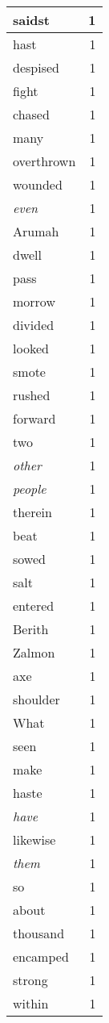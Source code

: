 \begin{center}
\begin{longtable}{l|r}
saidst & 1\\ \hline 
hast & 1\\ \hline 
despised & 1\\ \hline 
fight & 1\\ \hline 
chased & 1\\ \hline 
many & 1\\ \hline 
overthrown & 1\\ \hline 
wounded & 1\\ \hline 
\emph{even} & 1\\ \hline 
Arumah & 1\\ \hline 
dwell & 1\\ \hline 
pass & 1\\ \hline 
morrow & 1\\ \hline 
divided & 1\\ \hline 
looked & 1\\ \hline 
smote & 1\\ \hline 
rushed & 1\\ \hline 
forward & 1\\ \hline 
two & 1\\ \hline 
\emph{other} & 1\\ \hline 
\emph{people} & 1\\ \hline 
therein & 1\\ \hline 
beat & 1\\ \hline 
sowed & 1\\ \hline 
salt & 1\\ \hline 
entered & 1\\ \hline 
Berith & 1\\ \hline 
Zalmon & 1\\ \hline 
axe & 1\\ \hline 
shoulder & 1\\ \hline 
What & 1\\ \hline 
seen & 1\\ \hline 
make & 1\\ \hline 
haste & 1\\ \hline 
\emph{have} & 1\\ \hline 
likewise & 1\\ \hline 
\emph{them} & 1\\ \hline 
so & 1\\ \hline 
about & 1\\ \hline 
thousand & 1\\ \hline 
encamped & 1\\ \hline 
strong & 1\\ \hline 
within & 1\\ \hline 

\end{longtable}
\end{center}
